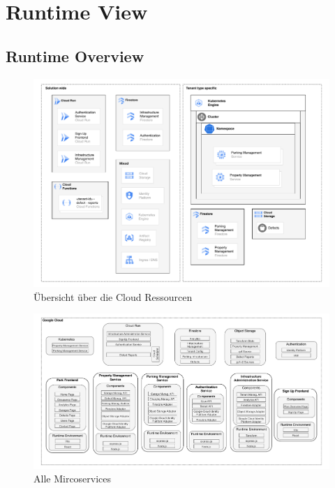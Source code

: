 \section{Runtime View}
\subsection{Runtime Overview}

\begin{figure}[ht]
	\centering
	\includegraphics[width=\textwidth]{resources/03-runtime-view/pdf/cloud-ressources.pdf}
	\caption{Übersicht über die Cloud Ressourcen}
	\label{fig:cloud-ressources}
\end{figure}

\begin{figure}[ht]
	\centering
	\includegraphics[width=\textwidth]{resources/03-runtime-view/pdf/architecture.pdf}
	\caption{Alle Mircoservices}
	\label{fig:system-architecture}
\end{figure}

